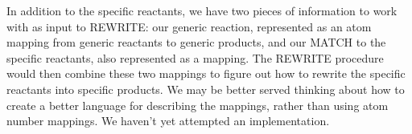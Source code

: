 \vspace{.1in}

In addition to the specific reactants, we have two pieces of information to
work with as input to REWRITE: our generic reaction, represented as an atom
mapping from generic reactants to generic products, and our MATCH to the
specific reactants, also represented as a mapping.  The REWRITE procedure
would then combine these two mappings to figure out how to rewrite the
specific reactants into specific products. We may be better served thinking
about how to create a better language for describing the mappings, rather
than using atom number mappings. We haven't yet attempted an
implementation.

